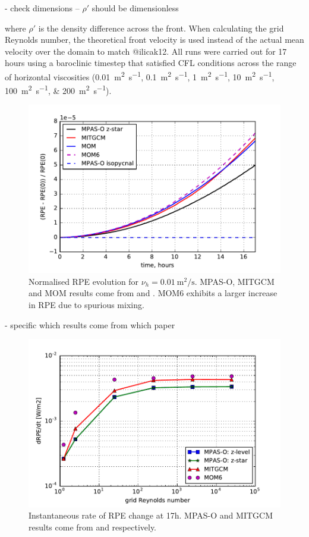 - check dimensions -- $\rho'$ should be dimensionless

where $\rho'$ is the density difference across the front. When calculating the grid Reynolds number, the theoretical front velocity is used instead of the actual mean velocity over the domain to match @ilicak12. All runs were carried out for 17 hours using a baroclinic timestep that satisfied CFL conditions across the range of horizontal viscosities (\SIlist{0.01;0.1;1;10;100;200}{\square\metre\per\second}).

\begin{figure}
  \includegraphics{../plots/lock_exchange_rpe_norm.pdf}
  \caption{\label{fig:lock-rpenorm} Normalised RPE evolution for $\nu_h = \SI{0.01}{\square\metre\per\second}$. MPAS-O, MITGCM and MOM results come from \citet{petersen15} and \citet{ilicak12}. MOM6 exhibits a larger increase in RPE due to spurious mixing.}
\end{figure}

- specific which results come from which paper

\begin{figure}
  \includegraphics{../plots/lock_exchange_drpe.pdf}
  \caption{\label{fig:lock-drpe} Instantaneous rate of RPE change at 17h. MPAS-O and MITGCM results come from \citet{petersen15} and \citet{ilicak12} respectively.}
\end{figure}

